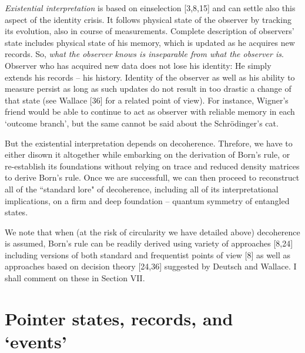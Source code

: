 \documentclass[aps,pra,epsfig,11pt,floatfix]{revtex4}
\begin{document}
{\it Existential interpretation} is based on einselection [3,8,15] and can
settle also this aspect of the identity crisis. It follows physical state
of the observer by tracking its evolution, also in course of measurements.
Complete description of observers' state includes physical state of his memory,
which is updated as he acquires new records. So, {\it what the observer
knows is inseparable from what the observer is}. Observer who has acquired new
data does not lose his identity:  He simply extends his records -- his
history. Identity of the observer as well as his ability to measure persist
as long as such updates do not result in too drastic a change of that state
(see Wallace [36] for a related point of view).  For instance, Wigner's friend
would be able to continue to act as observer with reliable memory in each
`outcome branch', but the same cannot be said about the Schr\"odinger's cat.

But the existential interpretation depends on decoherence. Threfore, we have to
either disown it altogether while embarking on the derivation of Born's rule, 
or re-establish its foundations without relying on trace and reduced density 
matrices to derive Born's rule. Once we are successfull, we can then proceed
to reconstruct all of the ``standard lore" of decoherence, including all of its 
interpretational implications, on a firm and deep foundation -- quantum
symmetry of entangled states.

We note that when (at the risk of circularity we have detailed above)
decoherence is assumed, Born's rule can be readily derived using variety
of approaches [8,24] including versions of both standard and frequentist
points of view [8] as well as approaches based on decision theory [24,36]
suggested by Deutsch and Wallace. I shall comment on these in Section VII.

\section{Pointer states, records, and `events'}
\end{document}
